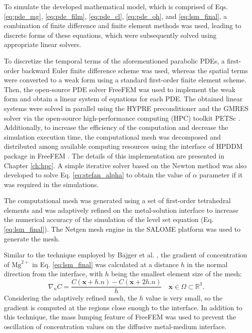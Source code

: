 To simulate the developed mathematical model, which is comprised of Eqs. \ref{eq:pde_mg}, \ref{eq:pde_film}, \ref{eq:pde_cl}, \ref{eq:pde_oh}, and \ref{eq:lsm_final}, a combination of finite difference and finite element methods was used, leading to discrete forms of these equations, which were subsequently solved using appropriate linear solvers.


To discretize the temporal terms of the aforementioned parabolic \gls{PDE}s, a first-order backward Euler finite difference scheme was used, whereas the spatial terms were converted to a weak form using a standard first-order finite element scheme. Then, the open-source \gls{PDE} solver FreeFEM \cite{Hecht2012} was used to implement the weak form and obtain a linear system of equations for each \gls{PDE}. The obtained linear systems were solved in parallel using the HYPRE preconditioner \cite{Falgout2002} and the \gls{GMRES} solver \cite{Saad1986} via the open-source high-performance computing (\gls{HPC}) toolkit \gls{PETSc} \cite{petsc}. Additionally, to increase the efficiency of the computation and decrease the simulation execution time, the computational mesh was decomposed and distributed among available computing resources using the interface of \gls{HPDDM} package in FreeFEM \cite{Jolivet2013}. The details of this implementation are presented in Chapter \ref{ch:hpc}. A simple iterative solver based on the Newton method was also developed to solve Eq. \ref{eq:stefan_alpha} to obtain the value of $\alpha$ parameter if it was required in the simulations.

The computational mesh was generated using a set of first-order tetrahedral elements and was adaptively refined on the metal-solution interface to increase the numerical accuracy of the simulation of the level set equation (Eq. \ref{eq:lsm_final}). The Netgen mesh engine \cite{Schoeberl1997} in the SALOME platform \cite{Ribes2007} was used to generate the mesh.

Similar to the technique employed by Bajger et al. \cite{Bajger2016}, the gradient of concentration of $\mathrm{Mg}^{2+}$ in Eq. \ref{eq:lsm_final} was calculated at a distance $h$ in the normal direction from the interface, with $h$ being the smallest element size of the mesh:
\begin{equation} \label{eq:c_gradient}
\nabla_{n} C = \frac{C\left( \mathbf{x} + h.n \right) - C\left( \mathbf{x} + 2h.n \right)}{h} \quad \mathbf{x} \in \Omega \subset \mathbb{R}^{3}.
\end{equation}
Considering the adaptively refined mesh, the $h$ value is very small, so the gradient is computed at the regions close enough to the interface. In addition to this technique, the mass lumping feature of FreeFEM was used to prevent the oscillation of concentration values on the diffusive metal-medium interface.

